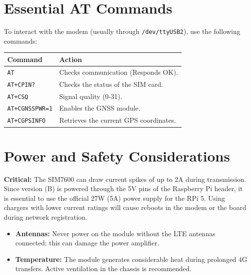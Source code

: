 \documentclass[11pt]{article}
\begin{document}
\section{Essential AT Commands}

To interact with the modem (usually through \texttt{/dev/ttyUSB2}), use the following commands:

\begin{table}[h]
    \centering
    \begin{tabular}{ll}
        \toprule
        \textbf{Command} & \textbf{Action} \\
        \midrule
        \texttt{AT} & Checks communication (Responds OK). \\
        \texttt{AT+CPIN?} & Checks the status of the SIM card. \\
        \texttt{AT+CSQ} & Signal quality (0-31). \\
        \texttt{AT+CGNSSPWR=1} & Enables the GNSS module. \\
        \texttt{AT+CGPSINFO} & Retrieves the current GPS coordinates. \\
        \bottomrule
    \end{tabular}
\end{table}

\section{Power and Safety Considerations}

\begin{warningbox}
\textbf{Critical:} The SIM7600 can draw current spikes of up to 2A during transmission. Since version (B) is powered through the 5V pins of the Raspberry Pi header, it is essential to use the official 27W (5A) power supply for the RPi 5. Using chargers with lower current ratings will cause reboots in the modem or the board during network registration.
\end{warningbox}

\begin{itemize}
    \item \textbf{Antennas:} Never power on the module without the LTE antennas connected; this can damage the power amplifier.
    \item \textbf{Temperature:} The module generates considerable heat during prolonged 4G transfers. Active ventilation in the chassis is recommended.
\end{itemize}
\end{document}
